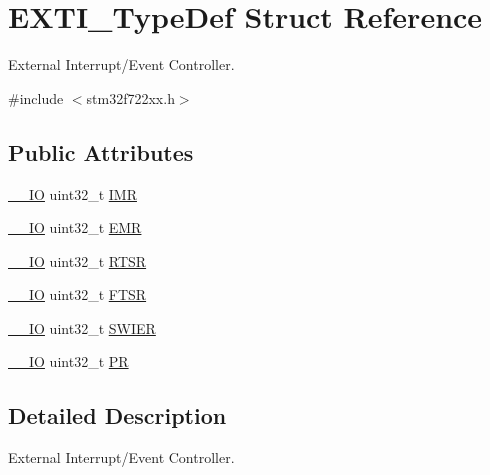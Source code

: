 \hypertarget{struct_e_x_t_i___type_def}{}\section{E\+X\+T\+I\+\_\+\+Type\+Def Struct Reference}
\label{struct_e_x_t_i___type_def}


External Interrupt/\+Event Controller.  




{\ttfamily \#include $<$stm32f722xx.\+h$>$}

\subsection*{Public Attributes}
\begin{DoxyCompactItemize}
\item 
\mbox{\hyperlink{core__sc300_8h_aec43007d9998a0a0e01faede4133d6be}{\+\_\+\+\_\+\+IO}} uint32\+\_\+t \mbox{\hyperlink{struct_e_x_t_i___type_def_a17d061db586d4a5aa646b68495a8e6a4}{I\+MR}}
\item 
\mbox{\hyperlink{core__sc300_8h_aec43007d9998a0a0e01faede4133d6be}{\+\_\+\+\_\+\+IO}} uint32\+\_\+t \mbox{\hyperlink{struct_e_x_t_i___type_def_a9c5bff67bf9499933959df7eb91a1bd6}{E\+MR}}
\item 
\mbox{\hyperlink{core__sc300_8h_aec43007d9998a0a0e01faede4133d6be}{\+\_\+\+\_\+\+IO}} uint32\+\_\+t \mbox{\hyperlink{struct_e_x_t_i___type_def_ac019d211d8c880b327a1b90a06cc0675}{R\+T\+SR}}
\item 
\mbox{\hyperlink{core__sc300_8h_aec43007d9998a0a0e01faede4133d6be}{\+\_\+\+\_\+\+IO}} uint32\+\_\+t \mbox{\hyperlink{struct_e_x_t_i___type_def_aee667dc148250bbf37fdc66dc4a9874d}{F\+T\+SR}}
\item 
\mbox{\hyperlink{core__sc300_8h_aec43007d9998a0a0e01faede4133d6be}{\+\_\+\+\_\+\+IO}} uint32\+\_\+t \mbox{\hyperlink{struct_e_x_t_i___type_def_a5c1f538e64ee90918cd158b808f5d4de}{S\+W\+I\+ER}}
\item 
\mbox{\hyperlink{core__sc300_8h_aec43007d9998a0a0e01faede4133d6be}{\+\_\+\+\_\+\+IO}} uint32\+\_\+t \mbox{\hyperlink{struct_e_x_t_i___type_def_a133294b87dbe6a01e8d9584338abc39a}{PR}}
\end{DoxyCompactItemize}


\subsection{Detailed Description}
External Interrupt/\+Event Controller. 

